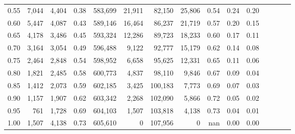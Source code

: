 \begin{tabular}{rrrcrrrrrrrrrrr}
0.55 &    7,044 &   4,404 &                                       0.38 &  583,699 &   21,911 &   82,150 &   25,806 &  0.54 &  0.24 &                         0.20 \\
0.60 &    5,447 &   4,087 &                                       0.43 &  589,146 &   16,464 &   86,237 &   21,719 &  0.57 &  0.20 &                         0.15 \\
0.65 &    4,178 &   3,486 &                                       0.45 &  593,324 &   12,286 &   89,723 &   18,233 &  0.60 &  0.17 &                         0.11 \\
0.70 &    3,164 &   3,054 &                                       0.49 &  596,488 &    9,122 &   92,777 &   15,179 &  0.62 &  0.14 &                         0.08 \\
0.75 &    2,464 &   2,848 &                                       0.54 &  598,952 &    6,658 &   95,625 &   12,331 &  0.65 &  0.11 &                         0.06 \\
0.80 &    1,821 &   2,485 &                                       0.58 &  600,773 &    4,837 &   98,110 &    9,846 &  0.67 &  0.09 &                         0.04 \\
0.85 &    1,412 &   2,073 &                                       0.59 &  602,185 &    3,425 &  100,183 &    7,773 &  0.69 &  0.07 &                         0.03 \\
0.90 &    1,157 &   1,907 &                                       0.62 &  603,342 &    2,268 &  102,090 &    5,866 &  0.72 &  0.05 &                         0.02 \\
0.95 &      761 &   1,728 &                                       0.69 &  604,103 &    1,507 &  103,818 &    4,138 &  0.73 &  0.04 &                         0.01 \\
1.00 &    1,507 &   4,138 &                                       0.73 &  605,610 &        0 &  107,956 &        0 &   nan &  0.00 &                         0.00 \\
\bottomrule
\end{tabular}
